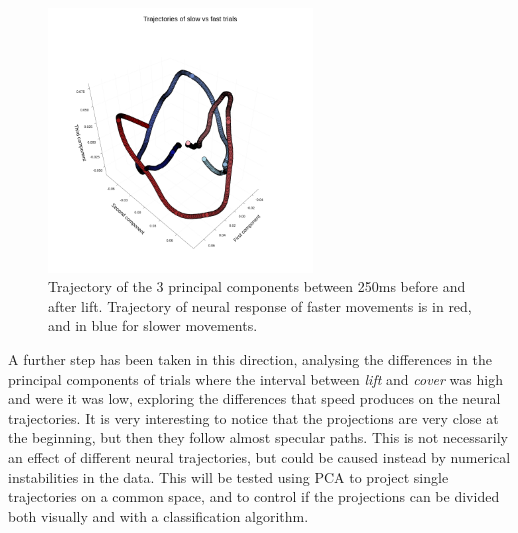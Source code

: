 \bigskip

\begin{figure}
	\centering
	\includegraphics[width=7.0cm]{../../plots/pca-speed.png}
	\caption{Trajectory of the 3 principal components between 250ms before and after lift. Trajectory of neural response of faster movements is in red, and in blue for slower movements.}
	\label{fig:pca-speed}
\end{figure}
A further step has been taken in this direction, analysing the differences in the principal components of trials where the interval between \emph{lift} and \emph{cover} was high and were it was low, exploring the differences that speed produces on the neural trajectories.
It is very interesting to notice that the projections are very close at the beginning, but then they follow almost specular paths.
This is not necessarily an effect of different neural trajectories, but could be caused instead by numerical instabilities in the data. This will be tested using PCA to project single trajectories on a common space, and to control if the projections can be divided both visually and with a classification algorithm. 
\pagebreak

